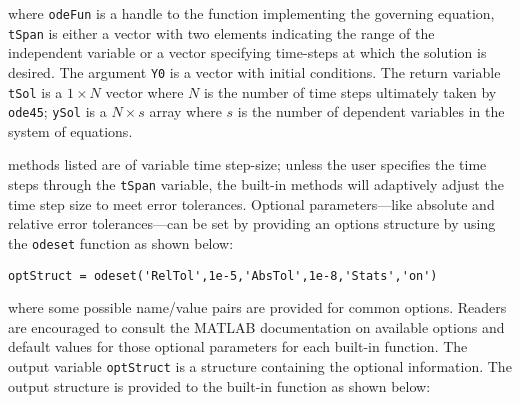 \vspace{0.25cm}


\noindent where \lstinline[style=myMatlab]{odeFun} is a handle to the function implementing the governing equation, \lstinline[style=myMatlab]{tSpan} is either a vector with two elements indicating the range of the independent variable or a vector specifying time-steps at which the solution is desired. The argument \lstinline[style=myMatlab]{Y0} is a vector with initial conditions.  The return variable \lstinline[style=myMatlab]{tSol} is a $1 \times N$ vector where $N$ is the number of time steps ultimately taken by \lstinline[style=myMatlab]{ode45}; \lstinline[style=myMatlab]{ySol} is a $N \times s$ array where $s$ is the number of dependent variables in the system of equations.

 methods listed are of variable time step-size; unless the user specifies the time steps through the \lstinline[style=myMatlab]{tSpan} variable, the built-in methods will adaptively adjust the time step size to meet error tolerances.  Optional parameters---like absolute and relative error tolerances---can be set by providing an options structure by using the \lstinline[style=myMatlab]{odeset} function as shown below:

\vspace{0.25cm}

\noindent\parbox{\textwidth}{
\centering
\lstinline[style=myMatlab]{optStruct = odeset('RelTol',1e-5,'AbsTol',1e-8,'Stats','on')} 

}

\vspace{0.25cm}

\noindent where some possible name/value pairs are provided for common options.  Readers are encouraged to consult the MATLAB documentation on available options and default values for those optional parameters for each built-in function.  The output variable \lstinline[style=myMatlab]{optStruct} is a structure containing the optional information.  The output structure is provided to the built-in function as shown below:

\vspace{0.25cm}

